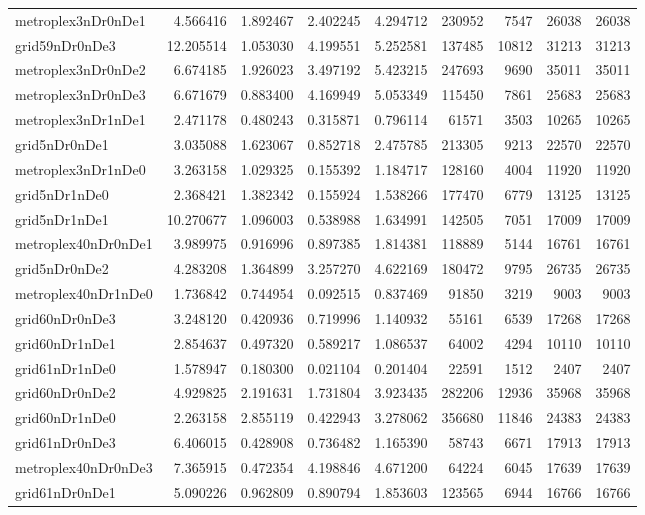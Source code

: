 \documentclass[../../../thesis.tex]{subfiles}
\begin{document}
\begin{longtable}{|l|r|r|r|r|r|r|r|r|}
metroplex3nDr0nDe1 & 4.566416 & 1.892467 & 2.402245 & 4.294712 & 230952 & 7547 & 26038 & 26038 \\
grid59nDr0nDe3 & 12.205514 & 1.053030 & 4.199551 & 5.252581 & 137485 & 10812 & 31213 & 31213 \\
metroplex3nDr0nDe2 & 6.674185 & 1.926023 & 3.497192 & 5.423215 & 247693 & 9690 & 35011 & 35011 \\
metroplex3nDr0nDe3 & 6.671679 & 0.883400 & 4.169949 & 5.053349 & 115450 & 7861 & 25683 & 25683 \\
metroplex3nDr1nDe1 & 2.471178 & 0.480243 & 0.315871 & 0.796114 & 61571 & 3503 & 10265 & 10265 \\
grid5nDr0nDe1 & 3.035088 & 1.623067 & 0.852718 & 2.475785 & 213305 & 9213 & 22570 & 22570 \\
metroplex3nDr1nDe0 & 3.263158 & 1.029325 & 0.155392 & 1.184717 & 128160 & 4004 & 11920 & 11920 \\
grid5nDr1nDe0 & 2.368421 & 1.382342 & 0.155924 & 1.538266 & 177470 & 6779 & 13125 & 13125 \\
grid5nDr1nDe1 & 10.270677 & 1.096003 & 0.538988 & 1.634991 & 142505 & 7051 & 17009 & 17009 \\
metroplex40nDr0nDe1 & 3.989975 & 0.916996 & 0.897385 & 1.814381 & 118889 & 5144 & 16761 & 16761 \\
grid5nDr0nDe2 & 4.283208 & 1.364899 & 3.257270 & 4.622169 & 180472 & 9795 & 26735 & 26735 \\
metroplex40nDr1nDe0 & 1.736842 & 0.744954 & 0.092515 & 0.837469 & 91850 & 3219 & 9003 & 9003 \\
grid60nDr0nDe3 & 3.248120 & 0.420936 & 0.719996 & 1.140932 & 55161 & 6539 & 17268 & 17268 \\
grid60nDr1nDe1 & 2.854637 & 0.497320 & 0.589217 & 1.086537 & 64002 & 4294 & 10110 & 10110 \\
grid61nDr1nDe0 & 1.578947 & 0.180300 & 0.021104 & 0.201404 & 22591 & 1512 & 2407 & 2407 \\
grid60nDr0nDe2 & 4.929825 & 2.191631 & 1.731804 & 3.923435 & 282206 & 12936 & 35968 & 35968 \\
grid60nDr1nDe0 & 2.263158 & 2.855119 & 0.422943 & 3.278062 & 356680 & 11846 & 24383 & 24383 \\
grid61nDr0nDe3 & 6.406015 & 0.428908 & 0.736482 & 1.165390 & 58743 & 6671 & 17913 & 17913 \\
metroplex40nDr0nDe3 & 7.365915 & 0.472354 & 4.198846 & 4.671200 & 64224 & 6045 & 17639 & 17639 \\
grid61nDr0nDe1 & 5.090226 & 0.962809 & 0.890794 & 1.853603 & 123565 & 6944 & 16766 & 16766 \\

\end{longtable}
\end{document}
